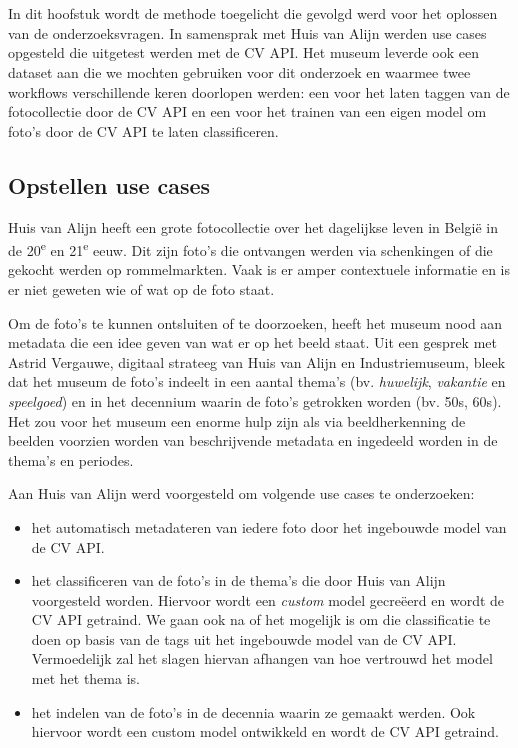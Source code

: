
\chapter{}
\label{ch:methodologie}

In dit hoofstuk wordt de methode toegelicht die gevolgd werd voor het oplossen van de onderzoeksvragen. In samensprak met Huis van Alijn werden use cases opgesteld die uitgetest werden met de CV API. Het museum leverde ook een dataset aan die we mochten gebruiken voor dit onderzoek en waarmee twee workflows verschillende keren doorlopen werden: een voor het laten taggen van de fotocollectie door de CV API en een voor het trainen van een eigen model om foto's door de CV API te laten classificeren.

\section{Opstellen use cases}
\label{sec:opstellen-use-cases}

Huis van Alijn heeft een grote fotocollectie over het dagelijkse leven in Belgi\"{e} in de 20\textsuperscript{e} en 21\textsuperscript{e} eeuw. Dit zijn foto’s die ontvangen werden via schenkingen of die gekocht werden op rommelmarkten. Vaak is er amper contextuele informatie en is er niet geweten wie of wat op de foto staat. 

Om de foto’s te kunnen ontsluiten of te doorzoeken, heeft het museum nood aan metadata die een idee geven van wat er op het beeld staat. Uit een gesprek met Astrid Vergauwe, digitaal strateeg van Huis van Alijn en Industriemuseum, bleek dat het museum de foto’s indeelt in een aantal thema’s (bv. \textit{huwelijk}, \textit{vakantie} en \textit{speelgoed}) en in het decennium waarin de foto’s getrokken worden (bv. 50s, 60s). Het zou voor het museum een enorme hulp zijn als via beeldherkenning de beelden voorzien worden van beschrijvende metadata en ingedeeld worden in de thema’s en periodes.

Aan Huis van Alijn werd voorgesteld om volgende use cases te onderzoeken:
\begin{itemize}
	\item het automatisch metadateren van iedere foto door het ingebouwde model van de CV API.
	\item het classificeren van de foto’s in de thema’s die door Huis van Alijn voorgesteld worden. Hiervoor wordt een \textit{custom} model gecre\"{e}erd en wordt de CV API getraind. We gaan ook na of het mogelijk is om die classificatie te doen op basis van de tags uit het ingebouwde model van de CV API. Vermoedelijk zal het slagen hiervan afhangen van hoe vertrouwd het model met het thema is. 
	\item het indelen van de foto’s in de decennia waarin ze gemaakt werden. Ook hiervoor wordt een custom model ontwikkeld en wordt de CV API getraind.
\end{itemize}

